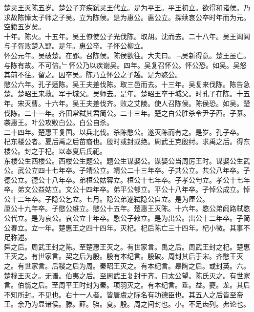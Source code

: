 \documentclass{zhvt-classic}
\begin{document}
\hspace*{2em}楚灵王灭陈五岁。楚公子弃疾弑灵王代立。是为平王。平王初立。欲得和诸侯。乃求故陈悼太子师之子吴。立为陈侯。是为惠公。惠公立。探续哀公卒时年而为元。空籍五岁矣。\\
\hspace*{2em}十年。陈火。十五年。吴王僚使公子光伐陈。取胡。沈而去。二十八年。吴王阖闾与子胥败楚入郢。是年。惠公卒。子怀公柳立。\\
\hspace*{2em}怀公元年。吴破楚。在郢。召陈侯。陈侯欲往。大夫曰。﹁吴新得意。楚王虽亡。与陈有故。不可倍。﹂怀公乃以疾谢吴。四年。吴复召怀公。怀公恐。如吴。吴怒其前不往。留之。因卒吴。陈乃立怀公之子越。是为愍公。\\
\hspace*{2em}愍公六年。孔子适陈。吴王夫差伐陈。取三邑而去。十三年。吴复来伐陈。陈告急楚。楚昭王来救。军于城父。吴师去。是年。楚昭王卒于城父。时孔子在陈。十五年。宋灭曹。十六年。吴王夫差伐齐。败之艾陵。使人召陈侯。陈侯恐。如吴。楚伐陈。二十一年。齐田常弑其君简公。二十三年。楚之白公胜杀令尹子西。子綦。袭惠王。叶公攻败白公。白公自杀。\\
\hspace*{2em}二十四年。楚惠王复国。以兵北伐。杀陈愍公。遂灭陈而有之。是岁。孔子卒。\\
\hspace*{2em}杞东楼公者。夏后禹之后苗裔也。殷时或封或绝。周武王克殷纣。求禹之后。得东楼公。封之于杞。以奉夏后氏祀。\\
\hspace*{2em}东楼公生西楼公。西楼公生题公。题公生谋娶公。谋娶公当周厉王时。谋娶公生武公。武公立四十七年卒。子靖公立。靖公二十三年卒。子共公立。共公八年卒。子德公立。德公十八年卒。弟桓公姑容立。桓公十七年卒。子孝公匄立。孝公十七年卒。弟文公益姑立。文公十四年卒。弟平公郁立。平公十八年卒。子悼公成立。悼公十二年卒。子隐公乞立。七月。隐公弟遂弑隐公自立。是为厘公。\\
\hspace*{2em}厘公十九年卒。子愍公维立。愍公十五年。楚惠王灭陈。十六年。愍公弟阏路弑愍公代立。是为哀公。哀公立十年卒。愍公子敕立。是为出公。出公十二年卒。子简公春立。立一年。楚惠王之四十四年。灭杞。杞后陈亡三十四年。杞小微。其事不足称述。\\
\hspace*{2em}舜之后。周武王封之陈。至楚惠王灭之。有世家言。禹之后。周武王封之杞。楚惠王灭之。有世家言。契之后为殷。殷有本纪言。殷破。周封其后于宋。齐愍王灭之。有世家言。后稷之后为周。秦昭王灭之。有本纪言。皋陶之后。或封英。六。楚穆王灭之。无谱。伯夷之后。至周武王复封于齐。曰太公望。陈氏灭之。有世家言。伯翳之后。至周平王时封为秦。项羽灭之。有本纪言。垂。益。夔。龙。其后不知所封。不见也。右十一人者。皆唐虞之际名有功德臣也。其五人之后皆至帝王。余乃为显诸侯。滕。薛。驺。夏。殷。周之间封也。小。不足齿列。弗论也。\\
\end{document}
